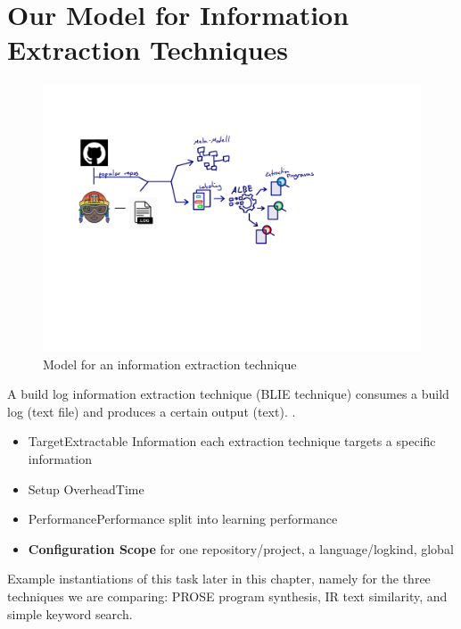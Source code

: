 \documentclass[\myrootdir/main.tex]{subfiles}
\begin{document}
\section{Our Model for Information Extraction Techniques}
\begin{figure}[h]
	\centering
	\includegraphics[page=3, width=\textwidth, trim={0.5cm 0.5cm 0.5cm 0.5cm}, clip]{img/flow-of-research.pdf}
	\caption{Model for an information extraction technique}
	\label{fig:model-ie-technique}
\end{figure}
A build log information extraction technique (BLIE technique) consumes a build log (text file) and produces a certain output (text). .
\begin{itemize}
	\item{Target}{Extractable Information} each extraction technique  targets a specific information
	\item{Setup Overhead}{Time}
	\item{Performance}{Performance} split into learning performance
	\item \textbf{Configuration Scope} for one repository/project, a language/logkind, global
\end{itemize}

Example instantiations of this task later in this chapter, namely for the three techniques we are comparing: PROSE program synthesis, IR text similarity, and simple keyword search. 
\end{document}
